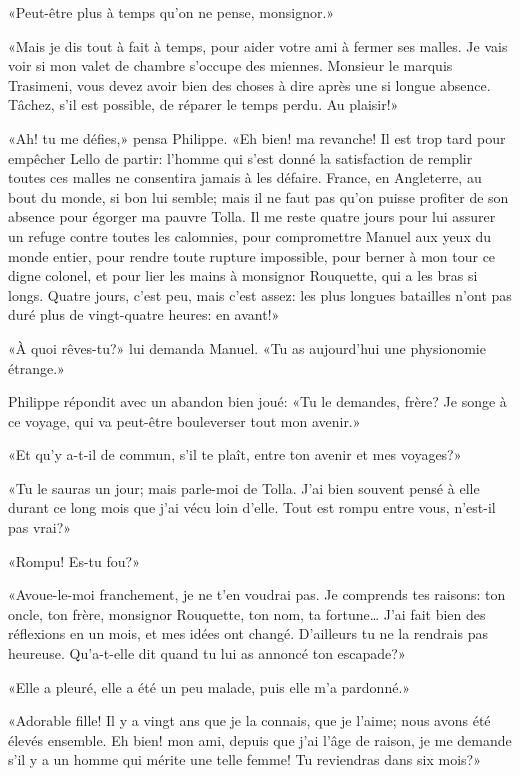 «Peut-être plus à temps qu'on ne pense, monsignor.»

«Mais je dis tout à fait à temps, pour aider votre ami à fermer ses malles. Je vais voir si mon valet de chambre s'occupe des miennes. Monsieur le marquis Trasimeni, vous devez avoir bien des choses à dire après une si longue absence. Tâchez, s'il est possible, de réparer le temps perdu. Au plaisir!»

«Ah! tu me défies,» pensa Philippe. «Eh bien! ma revanche! Il est trop tard pour empêcher Lello de partir: l'homme qui s'est donné la satisfaction de remplir toutes ces malles ne consentira jamais à les défaire. France, en Angleterre, au bout du monde, si bon lui semble; mais il ne faut pas qu'on puisse profiter de son absence pour égorger ma pauvre Tolla. Il me reste quatre jours pour lui assurer un refuge contre toutes les calomnies, pour compromettre Manuel aux yeux du monde entier, pour rendre toute rupture impossible, pour berner à mon tour ce digne colonel, et pour lier les mains à monsignor Rouquette, qui a les bras si longs. Quatre jours, c'est peu, mais c'est assez: les plus longues batailles n'ont pas duré plus de vingt-quatre heures: en avant!»

«À quoi rêves-tu?» lui demanda Manuel. «Tu as aujourd'hui une physionomie étrange.»

Philippe répondit avec un abandon bien joué: «Tu le demandes, frère? Je songe à ce voyage, qui va peut-être bouleverser tout mon avenir.»

«Et qu'y a-t-il de commun, s'il te plaît, entre ton avenir et mes voyages?»

«Tu le sauras un jour; mais parle-moi de Tolla. J'ai bien souvent pensé à elle durant ce long mois que j'ai vécu loin d'elle. Tout est rompu entre vous, n'est-il pas vrai?»

\enlargethispage{\baselineskip}

«Rompu! Es-tu fou?»

«Avoue-le-moi franchement, je ne t'en voudrai pas. Je comprends tes raisons: ton oncle, ton frère, monsignor Rouquette, ton nom, ta fortune\ldots{} J'ai fait bien des réflexions en un mois, et mes idées ont changé. D'ailleurs tu ne la rendrais pas heureuse. Qu'a-t-elle dit quand tu lui as annoncé ton escapade?»

«Elle a pleuré, elle a été un peu malade, puis elle m'a pardonné.»

«Adorable fille! Il y a vingt ans que je la connais, que je l'aime; nous avons été élevés ensemble. Eh bien! mon ami, depuis que j'ai l'âge de raison, je me demande s'il y a un homme qui mérite une telle femme! Tu reviendras dans six mois?»


